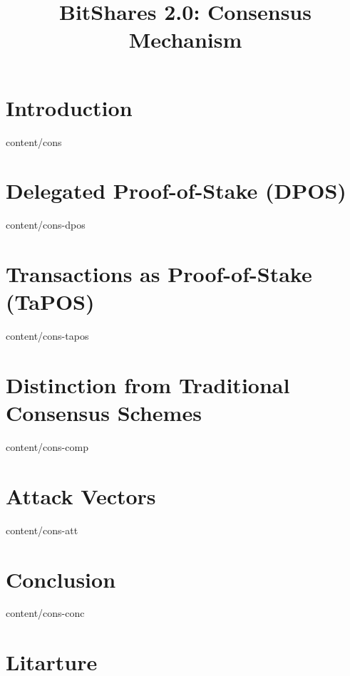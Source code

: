 \documentclass{btswhitepaper}
\title{BitShares 2.0: Consensus Mechanism}
\begin{document}
\maketitle

\begin{abstract}%
\end{abstract}
\section    { Introduction                                   }  { content/cons          } 
\section    { Delegated Proof-of-Stake (DPOS)                }  { content/cons-dpos     } 
\section    { Transactions as Proof-of-Stake (TaPOS)         }  { content/cons-tapos    } 
\section    { Distinction from Traditional Consensus Schemes }  { content/cons-comp     } 
\section    { Attack Vectors                                 }  { content/cons-att      } 
\section    { Conclusion                                     }  { content/cons-conc     } 
\section*   { Litarture                                      }


\end{document}

